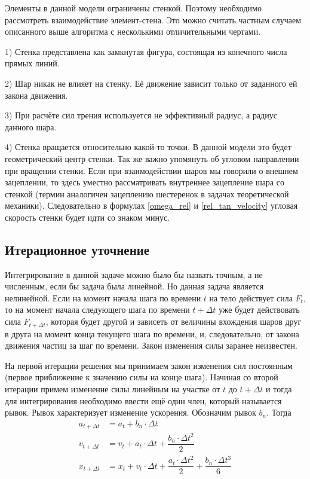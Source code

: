 \documentclass[utf8x, 14pt, oneside, a4paper]{article}
\begin{document}
Элементы в данной модели ограничены стенкой. 
Поэтому необходимо рассмотреть взаимодействие элемент-стена.
Это можно считать частным случаем описанного выше алгоритма с несколькими отличительными чертами.

1) Стенка представлена как замкнутая фигура, состоящая из конечного числа прямых линий.

2) Шар никак не влияет на стенку. 
Её движение зависит только от заданного ей закона движения.

3) При расчёте сил трения используется не эффективный радиус, а радиус данного шара.

4) Стенка вращается относительно какой-то точки.
В данной модели это будет геометрический центр стенки.
Так же важно упомянуть об угловом направлении при вращении стенки.
Если при взаимодействии шаров мы говорили о внешнем зацеплении, то здесь уместно рассматривать внутреннее зацепление шара со стенкой (термин аналогичен зацеплению шестеренок в задачах теоретической механики).
Следовательно в формулах \ref{omega_rel} и \ref{rel_tan_velocity} угловая скорость стенки будет идти со знаком минус.


 
\subsection{Итерационное уточнение}
\label{iter_subsection}


Интегрирование в данной задаче можно было бы назвать точным, а не численным, если бы задача была линейной.
Но данная задача является нелинейной. 
Если на момент начала шага по времени $t$ на тело действует сила $F_t$, то на момент начала следующего шага по времени $t + \Delta t$ уже будет действовать сила $F_{t + \Delta t}$, которая будет другой и зависеть от величины вхождения шаров друг в друга на момент конца текущего шага по времени, и, следовательно, от закона движения частиц за шаг по времени. 
Закон изменения силы заранее неизвестен.

На первой итерации решения мы принимаем закон изменения сил постоянным (первое приближение к значению силы на конце шага).
Начиная со второй итерации примем изменение силы линейным на участке от $t$ до $t + \Delta t$  и тогда для интегрирования необходимо ввести ещё один член, который называется рывок. 
Рывок характеризует изменение ускорения.
Обозначим рывок $b_n$.
Тогда
\begin{align}
a_{t + \Delta t} &= a_t + b_n \cdot \Delta t \\
v_{t + \Delta t} &= v_t + a_t \cdot \Delta t + \dfrac{b_n \cdot \Delta t^2}{2} \\
x_{t + \Delta t} &= x_t + v_t \cdot \Delta t + \dfrac{a_t \cdot \Delta t^2}{2} +  \dfrac{b_n \cdot \Delta t^3}{6}
\end{align}
\end{document}
